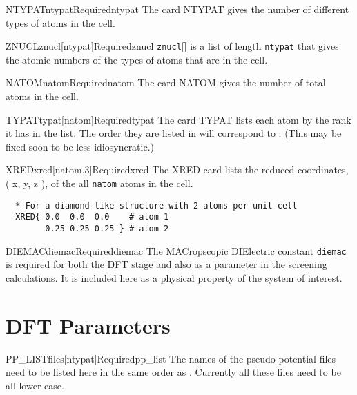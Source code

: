\documentclass[11pt]{report}
\begin{document}
\begin{Card}{NTYPAT}{ntypat}{Required}{ntypat}
The card NTYPAT gives the number of different types of atoms in the cell. 
\end{Card}

\begin{Card}{ZNUCL}{znucl[ntypat]}{Required}{znucl}
\texttt{znucl}[] is a list of length \texttt{ntypat} that gives the atomic numbers of the types of atoms that are in the cell.
\end{Card}

\begin{Card}{NATOM}{natom}{Required}{natom}
The card NATOM gives the number of total atoms in the cell.
\end{Card}

\begin{Card}{TYPAT}{typat[natom]}{Required}{typat}
The card TYPAT lists each atom by the rank it has in the  list. The order they are listed in will correspond to . (This may be fixed soon to be less idiosyncratic.)
\end{Card}

\begin{Card}{XRED}{xred[natom,3]}{Required}{xred}
The XRED card lists the reduced coordinates, ( x, y, z ), of the all \texttt{natom} atoms in the cell.
  \begin{verbatim}
  * For a diamond-like structure with 2 atoms per unit cell
  XRED{ 0.0  0.0  0.0    # atom 1
        0.25 0.25 0.25 } # atom 2
  \end{verbatim}
\end{Card}

\begin{Card}{DIEMAC}{diemac}{Required}{diemac}
The MACropscopic DIElectric constant \texttt{diemac} is required for both the DFT stage and also as a parameter in the screening calculations. It is included here as a physical property of the system of interest.
\end{Card}

\section{DFT Parameters}
\label{sec:DFT-Parameters}

\begin{Card}{PP\_LIST}{files[ntypat]}{Required}{pp_list}
The names of the pseudo-potential files need to be listed here in the same order as . Currently all these files need to be all lower case.
\end{Card}
\end{document}

